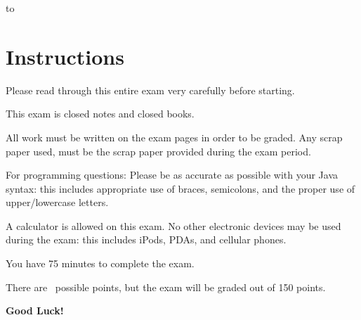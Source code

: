 \documentclass[11pt]{exam}
\begin{document}
\vspace{3.0in}
\begin{center} 
\end{center} 

\lstset{language=Python,numbers=left}

\vspace{0.1in} 
\hbox to \textwidth{Name:\enspace\hrulefill} 

\section*{Instructions}
Please read through this entire exam very carefully before starting.
\par
This exam is closed notes and closed books.
\par
All work must be written on the exam pages in order to be graded.   Any scrap paper used, must be the scrap paper provided during the exam period.
\par
For programming questions: Please be as accurate as possible with your Java syntax: this includes appropriate use of braces, semicolons, and the proper use of upper/lowercase letters.  
\par
A calculator is allowed on this exam.  \newline
No other electronic devices may be used during the exam: this includes iPods, PDAs, and cellular phones.
\par
You have 75 minutes to complete the exam.  
\par
There are \numpoints\ possible points, but the exam will be graded out of 150 points.
\par
{\bf Good Luck!}


\pagebreak
\end{document}
